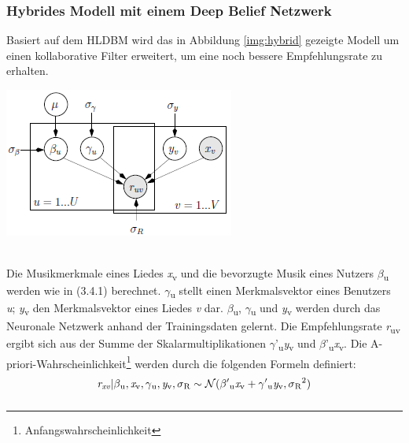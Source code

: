 \documentclass[twosided,a4,10pt]{article}
\begin{document}
\begin{multicols}{2}
		\subsubsection{Hybrides Modell mit einem Deep Belief Netzwerk}
		Basiert auf dem HLDBM wird das in Abbildung \ref{img:hybrid} gezeigte Modell um einen kollaborative Filter erweitert, um eine noch bessere Empfehlungsrate zu erhalten.
		\begin{minipage}{0.45\textwidth}
			\centering
			\includegraphics{img/hybrid.png}
			\label{img:hybrid}
		\end{minipage}\newline\\
		Die Musikmerkmale eines Liedes \textit{x}\textsubscript{v} und die bevorzugte Musik eines Nutzers $\beta$\textsubscript{u} werden wie in (3.4.1) berechnet. $\gamma$\textsubscript{u} stellt einen Merkmalsvektor eines Benutzers \textit{u}; \textit{y}\textsubscript{v} den Merkmalsvektor eines Liedes \textit{v} dar. $\beta$\textsubscript{u}, $\gamma$\textsubscript{u} und \textit{y}\textsubscript{v} werden durch das Neuronale Netzwerk anhand der Trainingsdaten gelernt. Die Empfehlungsrate \textit{r}\textsubscript{uv} ergibt sich aus der Summe der Skalarmultiplikationen  $\gamma$'\textsubscript{u}\textit{y}\textsubscript{v} und  $\beta$'\textsubscript{u}\textit{x}\textsubscript{v}. Die A-priori-Wahrscheinlichkeit\footnote[18]{Anfangswahrscheinlichkeit} werden durch die folgenden Formeln definiert:\newline
		\begin{equation*}
		\centering
		\textit{r\textsubscript{xv}}|\beta\textsubscript{u},\textit{x}\textsubscript{v},\gamma\textsubscript{u},\textit{y}\textsubscript{v},\sigma\textsubscript{R}\sim\mathcal{N}(\beta'\textsubscript{u}\textit{x}\textsubscript{v} + \gamma'\textsubscript{u}\textit{y}\textsubscript{v},\sigma\textsubscript{R}\textsuperscript{2})
		\end{equation*}
		\begin{equation*}

\end{equation*}
\end{multicols}
\end{document}
